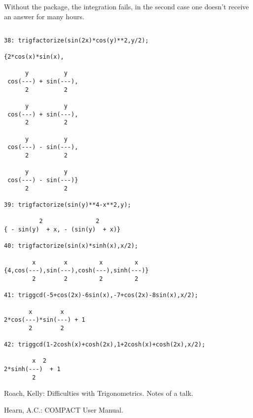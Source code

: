 Without the package, the integration fails, in the second case one doesn't
receive an answer for many hours.
{\small
\begin{verbatim}

38: trigfactorize(sin(2x)*cos(y)**2,y/2);

{2*cos(x)*sin(x),

      y          y
 cos(---) + sin(---),
      2          2

      y          y
 cos(---) + sin(---),
      2          2

      y          y
 cos(---) - sin(---),
      2          2

      y          y
 cos(---) - sin(---)}
      2          2

39: trigfactorize(sin(y)**4-x**2,y);

          2               2
{ - sin(y)  + x, - (sin(y)  + x)}

40: trigfactorize(sin(x)*sinh(x),x/2);

        x        x         x         x
{4,cos(---),sin(---),cosh(---),sinh(---)}
        2        2         2         2

41: triggcd(-5+cos(2x)-6sin(x),-7+cos(2x)-8sin(x),x/2);

       x        x
2*cos(---)*sin(---) + 1
       2        2

42: triggcd(1-2cosh(x)+cosh(2x),1+2cosh(x)+cosh(2x),x/2);

        x  2
2*sinh(---)  + 1
        2
\end{verbatim}
}

\begin{thebibliography}{99}

Roach, Kelly: Difficulties with Trigonometrics. Notes of a talk.

Hearn, A.C.: COMPACT User Manual.
\end{thebibliography}

